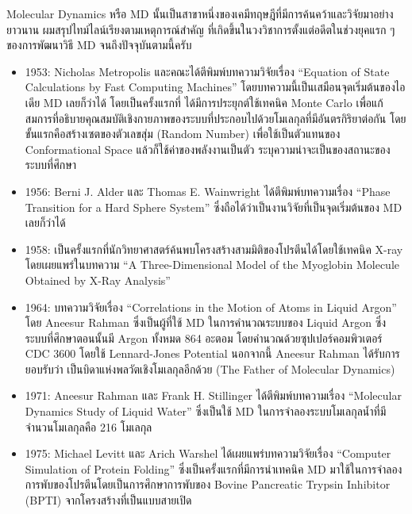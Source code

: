 Molecular Dynamics หรือ MD นั้นเป็นสาขาหนึ่งของเคมีทฤษฎีที่มีการค้นคว้าและวิจัยมาอย่างยาวนาน ผมสรุปไทม์ไลน์เรียงตามเหตุการณ์สำคัญ%
ที่เกิดขึ้นในวงวิชาการตั้งแต่อดีตในช่วงยุคแรก ๆ ของการพัฒนาวิธี MD จนถึงปัจจุบันตามนี้ครับ

\begin{itemize}[topsep=0pt,noitemsep]
  \setlength\itemsep{0.5em}
  \item 1953: Nicholas Metropolis และคณะได้ตีพิมพ์บทความวิจัยเรื่อง \enquote{Equation of State Calculations by Fast
          Computing Machines}\autocite{metropolis1953} โดยบทความนี้เป็นเสมือนจุดเริ่มต้นของไอเดีย MD เลยก็ว่าได้ โดยเป็นครั้งแรกที่%
        ได้มีการประยุกต์ใช้เทคนิค Monte Carlo เพื่อแก้สมการที่อธิบายคุณสมบัติเชิงกายภาพของระบบที่ประกอบไปด้วยโมเลกุลที่มีอันตรกิริยาต่อกัน
        โดยขั้นแรกคือสร้างเซตของตัวเลขสุ่ม (Random Number) เพื่อใช้เป็นตัวแทนของ Conformational Space แล้วก็ใช้ค่าของพลังงานเป็นตัว%
        ระบุความน่าจะเป็นของสถานะของระบบที่ศึกษา

  \item 1956: Berni J. Alder และ Thomas E. Wainwright ได้ตีพิมพ์บทความเรื่อง \enquote{Phase Transition for a Hard
          Sphere System}\autocite{alder1957} ซึ่งถือได้ว่าเป็นงานวิจัยที่เป็นจุดเริ่มต้นของ MD เลยก็ว่าได้

  \item 1958: เป็นครั้งแรกที่นักวิทยาศาสตร์ค้นพบโครงสร้างสามมิติของโปรตีนได้โดยใช้เทคนิค X-ray โดยเผยแพร่ในบทความ
        \enquote{A Three-Dimensional Model of the Myoglobin Molecule Obtained by X-Ray Analysis}\autocite{kendrew1958}

  \item 1964: บทความวิจัยเรื่อง \enquote{Correlations in the Motion of Atoms in Liquid Argon}\autocite{rahman1964}
        โดย Aneesur Rahman ซึ่งเป็นผู้ที่ใช้ MD ในการคำนวณระบบของ Liquid Argon ซึ่งระบบที่ศึกษาตอนนั้นมี Argon ทั้งหมด 864 อะตอม
        โดยคำนวณด้วยซุปเปอร์คอมพิวเตอร์  CDC 3600 โดยใช้ Lennard-Jones Potential นอกจากนี้ Aneesur Rahman ได้รับการยอบรับว่า%
        เป็นบิดาแห่งพลวัตเชิงโมเลกุลอีกด้วย (The Father of Molecular Dynamics)

  \item 1971: Aneesur Rahman และ Frank H. Stillinger ได้ตีพิมพ์บทความเรื่อง \enquote{Molecular Dynamics Study of
          Liquid Water}\autocite{rahman1971} ซึ่งเป็นใช้ MD ในการจำลองระบบโมเลกุลน้ำที่มีจำนวนโมเลกุลคือ 216 โมเลกุล

  \item 1975: Michael Levitt และ Arich Warshel ได้เผยแพร่บทความวิจัยเรื่อง \enquote{Computer Simulation of Protein
          Folding}\autocite{levitt1975} ซึ่งเป็นครั้งแรกที่มีการนำเทคนิค MD มาใช้ในการจำลองการพับของโปรตีนโดยเป็นการศึกษาการพับของ
        Bovine Pancreatic Trypsin Inhibitor (BPTI) จากโครงสร้างที่เป็นแบบสายเปิด


\end{itemize}

